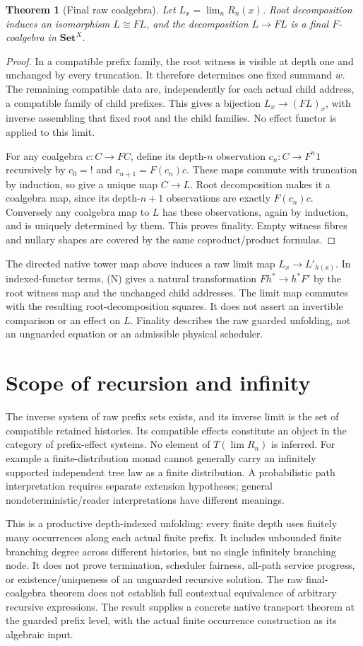\documentclass[11pt]{article}
\newtheorem{theorem}{Theorem}\newtheorem{proposition}{Proposition}
\begin{document}
\begin{theorem}[Final raw coalgebra]
Let $L_x=\lim_n R_n(x)$. Root decomposition induces an isomorphism $L\cong F L$, and the decomposition $L\to F L$ is a final $F$-coalgebra in $\mathbf{Set}^X$.
\end{theorem}
\begin{proof}
In a compatible prefix family, the root witness is visible at depth one and unchanged by every truncation. It therefore determines one fixed summand $w$. The remaining compatible data are, independently for each actual child address, a compatible family of child prefixes. This gives a bijection $L_x\to(F L)_x$, with inverse assembling that fixed root and the child families. No effect functor is applied to this limit.

For any coalgebra $c:C\to F C$, define its depth-$n$ observation $c_n:C\to F^n1$ recursively by $c_0=!$ and $c_{n+1}=F(c_n)c$. These maps commute with truncation by induction, so give a unique map $C\to L$. Root decomposition makes it a coalgebra map, since its depth-$n+1$ observations are exactly $F(c_n)c$. Conversely any coalgebra map to $L$ has these observations, again by induction, and is uniquely determined by them. This proves finality. Empty witness fibres and nullary shapes are covered by the same coproduct/product formulas.
\end{proof}

The directed native tower map above induces a raw limit map $L_x\to L'_{h(x)}$. In indexed-functor terms, (N) gives a natural transformation $Fh^*\to h^*F'$ by the root witness map and the unchanged child addresses. The limit map commutes with the resulting root-decomposition squares. It does not assert an invertible comparison or an effect on $L$. Finality describes the raw guarded unfolding, not an unguarded equation or an admissible physical scheduler.

\section{Scope of recursion and infinity}
The inverse system of raw prefix sets exists, and its inverse limit is the set of compatible retained histories. Its compatible effects constitute an object in the category of prefix-effect systems. No element of $T(\lim R_n)$ is inferred. For example a finite-distribution monad cannot generally carry an infinitely supported independent tree law as a finite distribution. A probabilistic path interpretation requires separate extension hypotheses; general nondeterministic/reader interpretations have different meanings.

This is a productive depth-indexed unfolding: every finite depth uses finitely many occurrences along each actual finite prefix. It includes unbounded finite branching degree across different histories, but no single infinitely branching node. It does not prove termination, scheduler fairness, all-path service progress, or existence/uniqueness of an unguarded recursive solution. The raw final-coalgebra theorem does not establish full contextual equivalence of arbitrary recursive expressions. The result supplies a concrete native transport theorem at the guarded prefix level, with the actual finite occurrence construction as its algebraic input.
\end{document}
